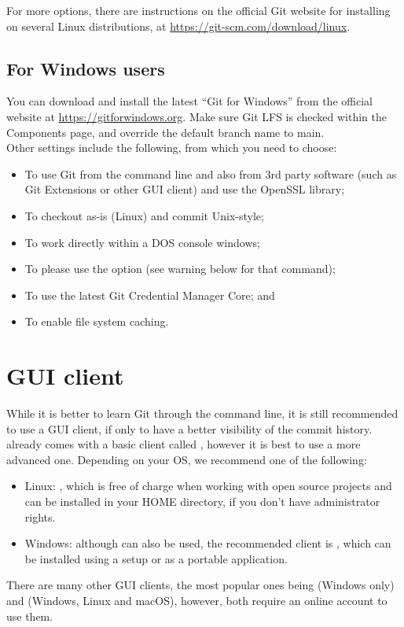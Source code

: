 For more options, there are instructions on the official Git website for
installing  on several Linux distributions, at
\url{https://git-scm.com/download/linux}.

\subsection{For Windows users}
You can download and install the latest ``Git for Windows'' from the official
website at \url{https://gitforwindows.org}. Make sure Git LFS is checked within
the Components page, and override the default branch name to main.\\

Other settings include the following, from which you need to choose:
\begin{itemize}
\item To use Git from the command line and also from 3rd party software (such
      as Git Extensions or other GUI client) and use the OpenSSL library;
\item To checkout as-is (Linux) and commit Unix-style;
\item To work directly within a DOS console windows;
\item To please use the  option (see
      warning below for that command);
\item To use the latest Git Credential Manager Core; and
\item To enable file system caching.
\end{itemize}

\section{GUI client}

While it is better to learn Git through the command line, it is still
recommended to use a GUI client, if only to have a better visibility of the
commit history.  already comes with a basic client called
, however it is best to use a more advanced one. Depending on your
OS, we recommend one of the following:

\begin{itemize}
\item Linux: , which is free of charge when working with open
      source projects and can be installed in your HOME directory, if you don't
      have administrator rights.
\item Windows: although  can also be used, the recommended client
      is , which can be installed using a setup or as a
      portable application.
\end{itemize}

There are many other GUI clients, the most popular ones being 
(Windows only) and  (Windows, Linux and macOS), however, both
require an online account to use them.
